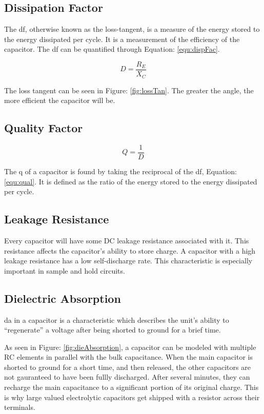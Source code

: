 \subsection{Dissipation Factor}


The \gls{df}, otherwise known as the loss-tangent, is a measure of the energy stored to the energy dissipated per cycle. It is a measurement of the efficiency of the capacitor. The \gls{df} can be quantified through Equation: \eqref{equ:dispFac}. 

\begin{equation}
\label{equ:dispFac}
D = \frac{R_E}{X_C}
\end{equation}

The loss tangent can be seen in Figure: \ref{fig:lossTan}. The greater the angle, the more efficient the capacitor will be.

\subsection{Quality Factor}

\begin{equation}
\label{equ:qual}
Q = \frac{1}{D}
\end{equation}

The \gls{q} of a capacitor is found by taking the reciprocal of the \acrlong{df}, Equation: \eqref{equ:qual}. It is defined as the ratio of the energy stored to the energy dissipated per cycle.

\subsection{Leakage Resistance}

Every capacitor will have some DC leakage resistance associated with it. This resistance affects the capacitor's ability to store charge. A capacitor with a high leakage resistance has a low self-discharge rate. This characteristic is especially important in sample and hold circuits.

\subsection{Dielectric Absorption}


\gls{da} in a capacitor is a characteristic which describes the unit's ability to ``regenerate'' a voltage after being shorted to ground for a brief time.

As seen in Figure: \ref{fig:dieAbsorption}, a capacitor can be modeled with multiple RC elements in parallel with the bulk capacitance. When the main capacitor is shorted to ground for a short time, and then released, the other capacitors are not gauranteed to have been fullly discharged. After several minutes, they can recharge the main capacitance to a significant portion of its original charge. This is why large valued electrolytic capacitors get shipped with a resistor across their terminals.

